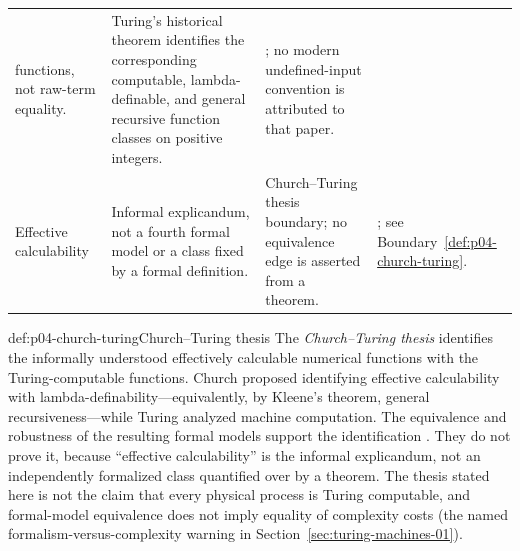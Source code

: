 \begin{landscape}
\begin{longtable}{@{}p{1.10in}p{2.25in}p{1.85in}p{1.84in}@{}}
functions, not raw-term equality. & Turing's historical theorem identifies the
corresponding computable, lambda-definable, and general recursive function
classes on positive integers. & \cite{Turing1937Lambda}; no modern
undefined-input convention is attributed to that paper. \\
\addlinespace
Effective calculability & Informal explicandum, not a fourth formal model or a
class fixed by a formal definition. & Church--Turing thesis boundary; no
equivalence edge is asserted from a theorem. &
\cite{Church1936,Turing1937Lambda,Soare1996ComputabilityRecursion}; see
Boundary~\ref{def:p04-church-turing}. \\
\bottomrule
\end{longtable}
\endgroup
\end{landscape}

\begin{proofboundary}{def:p04-church-turing}{Church--Turing thesis}
The \emph{Church--Turing thesis} identifies the informally understood
effectively calculable numerical functions with the Turing-computable
functions.  Church proposed identifying effective calculability with
lambda-definability---equivalently, by Kleene's theorem, general
recursiveness---while Turing analyzed machine computation.  The equivalence
and robustness of the resulting formal models support the identification
\cite{Church1936,Kleene1936,Turing1937Lambda,
Soare1996ComputabilityRecursion}.  They do
not prove it, because ``effective calculability'' is the informal explicandum,
not an independently formalized class quantified over by a theorem.  The
thesis stated here is not the claim that every physical process is Turing
computable, and formal-model equivalence does not imply equality of complexity
costs (the named formalism-versus-complexity warning in
Section~\ref{sec:turing-machines-01}).
\end{proofboundary}
